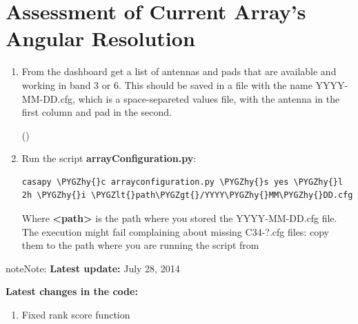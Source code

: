 \documentclass[a4paper,10pt,english]{sphinxmanual}
\def\PYGZlt{\char`\<}
\def\PYGZgt{\char`\>}
\def\PYGZhy{\char`\-}
\begin{document}
\section{Assessment of Current Array's Angular Resolution}
\label{apendix:assessment-of-current-array-s-angular-resolution}\label{apendix:current-conf}\begin{enumerate}
\item {} 
From the dashboard get a list of antennas and pads that are available and
working in band 3 or 6. This should be saved in a file with the name
YYYY-MM-DD.cfg, which is a space-separeted values file, with the antenna in the
first column and pad in the second.

()

\item {} 
Run the script \textbf{arrayConfiguration.py}:

\begin{Verbatim}[commandchars=\\\{\}]
casapy \PYGZhy{}c arrayconfiguration.py \PYGZhy{}s yes \PYGZhy{}l 2h \PYGZhy{}i \PYGZlt{}path\PYGZgt{}/YYYY\PYGZhy{}MM\PYGZhy{}DD.cfg
\end{Verbatim}

Where \textbf{\textless{}path\textgreater{}} is the path where you stored the YYYY-MM-DD.cfg file.
The execution might fail complaining about missing C34-?.cfg files: copy them
to the path where you are running the script from

\end{enumerate}

\begin{notice}{note}{Note:}
\textbf{Latest update:}
July 28, 2014

\textbf{Latest changes in the code:}
\begin{enumerate}
\item {} 
Fixed rank score function

\end{enumerate}
\end{notice}
\end{document}
